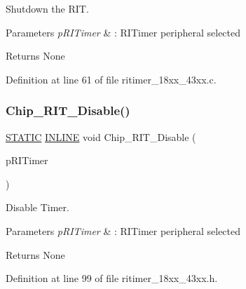 Shutdown the R\+IT. 


\begin{DoxyParams}{Parameters}
{\em p\+R\+I\+Timer} & \+: R\+I\+Timer peripheral selected \\
\hline
\end{DoxyParams}
\begin{DoxyReturn}{Returns}
None 
\end{DoxyReturn}


Definition at line 61 of file ritimer\+\_\+18xx\+\_\+43xx.\+c.

\mbox{\label{group___r_i_t_i_m_e_r__18_x_x__43_x_x_ga5ef90f2824763c979997e64ea8d6991b}} 
\subsubsection{\texorpdfstring{Chip\+\_\+\+R\+I\+T\+\_\+\+Disable()}{Chip\_RIT\_Disable()}}
{\footnotesize\ttfamily \hyperlink{group___l_p_c___types___public___macros_ga10b2d890d871e1489bb02b7e70d9bdfb}{S\+T\+A\+T\+IC} \hyperlink{spifi__18xx__43xx_8h_a2eb6f9e0395b47b8d5e3eeae4fe0c116}{I\+N\+L\+I\+NE} void Chip\+\_\+\+R\+I\+T\+\_\+\+Disable (\begin{DoxyParamCaption}\item[{\hyperlink{struct_l_p_c___r_i_t_i_m_e_r___t}{L\+P\+C\+\_\+\+R\+I\+T\+I\+M\+E\+R\+\_\+T} $\ast$}]{p\+R\+I\+Timer }\end{DoxyParamCaption})}



Disable Timer. 


\begin{DoxyParams}{Parameters}
{\em p\+R\+I\+Timer} & \+: R\+I\+Timer peripheral selected \\
\hline
\end{DoxyParams}
\begin{DoxyReturn}{Returns}
None 
\end{DoxyReturn}


Definition at line 99 of file ritimer\+\_\+18xx\+\_\+43xx.\+h.

